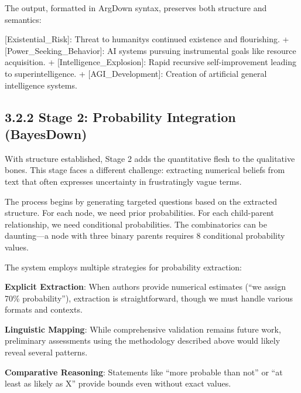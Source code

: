 \documentclass[
  11pt,
  letterpaper,
  openany]{book}
\newenvironment{Shaded}{\begin{snugshade}}{\end{snugshade}}
\newcommand{\CommentTok}[1]{\textcolor[rgb]{0.37,0.37,0.37}{#1}}
\newcommand{\NormalTok}[1]{\textcolor[rgb]{0.00,0.23,0.31}{#1}}
\newcommand{\OtherTok}[1]{\textcolor[rgb]{0.00,0.23,0.31}{#1}}
\newcommand{\SpecialStringTok}[1]{\textcolor[rgb]{0.13,0.47,0.30}{#1}}
\begin{document}
The output, formatted in ArgDown syntax, preserves both structure and
semantics:

\begin{Shaded}
\begin{Highlighting}[]
\OtherTok{[Existential\_Risk]: }\NormalTok{Threat to humanity\textquotesingle{}s continued existence and flourishing.}
\SpecialStringTok{ + }\CommentTok{[}\OtherTok{Power\_Seeking\_Behavior}\CommentTok{]}\NormalTok{: AI systems pursuing instrumental goals like resource acquisition.}
\SpecialStringTok{   + }\CommentTok{[}\OtherTok{Intelligence\_Explosion}\CommentTok{]}\NormalTok{: Rapid recursive self{-}improvement leading to superintelligence.}
\SpecialStringTok{     + }\CommentTok{[}\OtherTok{AGI\_Development}\CommentTok{]}\NormalTok{: Creation of artificial general intelligence systems.}
\end{Highlighting}
\end{Shaded}

\subsection{3.2.2 Stage 2: Probability Integration
(BayesDown)}\label{sec-stage2-bayesdown}

With structure established, Stage 2 adds the quantitative flesh to the
qualitative bones. This stage faces a different challenge: extracting
numerical beliefs from text that often expresses uncertainty in
frustratingly vague terms.

The process begins by generating targeted questions based on the
extracted structure. For each node, we need prior probabilities. For
each child-parent relationship, we need conditional probabilities. The
combinatorics can be daunting---a node with three binary parents
requires 8 conditional probability values.

The system employs multiple strategies for probability extraction:

\textbf{Explicit Extraction}: When authors provide numerical estimates
(``we assign 70\% probability''), extraction is straightforward, though
we must handle various formats and contexts.

\textbf{Linguistic Mapping}: While comprehensive validation remains
future work, preliminary assessments using the methodology described
above would likely reveal several patterns.

\textbf{Comparative Reasoning}: Statements like ``more probable than
not'' or ``at least as likely as X'' provide bounds even without exact
values.
\end{document}

